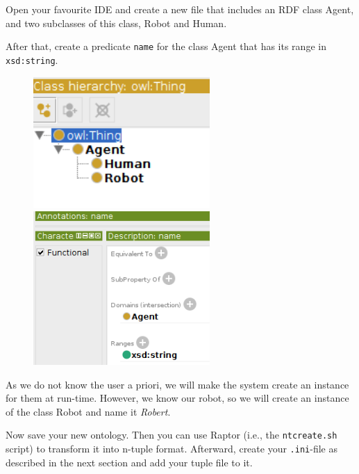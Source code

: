 \documentclass[a4paper]{report}
\begin{document}
Open your favourite IDE and create a new file that includes an RDF class Agent,
and two subclasses of this class, Robot and Human.

After that, create a predicate \texttt{name} for the class Agent that has its
range in \texttt{xsd:string}.

\begin{figure}
	\center
	    \begin{minipage}{0.45\textwidth}
		\centering
		\includegraphics[width=0.6\textwidth]{Images/doc_protege.png}
	\end{minipage}\hfill
	\begin{minipage}{0.45\textwidth}
		\centering
		\includegraphics[width=0.6\textwidth]{Images/doc_protege2.png}
	\end{minipage}
\end{figure}

As we do not know the user a priori, we will make the system create an instance
for them at run-time. However, we know our robot, so we will create an instance
of the class Robot and name it \textit{Robert}.

Now save your new ontology. Then you can use Raptor (i.e., the
\texttt{ntcreate.sh} script) to transform it into n-tuple format. Afterward,
create your \texttt{.ini}-file as described in the next section and add your
tuple file to it.
\end{document}
